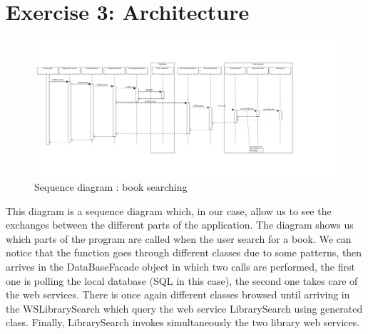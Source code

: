 \documentclass[a4paper,10pt]{article}
\begin{document}
\section{Exercise 3: Architecture}
\clearpage
\begin{landscape}
\begin{figure}[h]
   \includegraphics[scale=0.4]{uml/sequence.png}
   \caption{\label{sequence} Sequence diagram : book searching}
\end{figure}
\end{landscape}
This diagram is a sequence diagram which, in our case, allow us to see the exchanges between the different parts of the application. The diagram shows us which parts of the program are called when the user search for a book. We can notice that the function goes through different classes due to some patterns, then arrives in the DataBaseFacade object in which two calls are performed, the first one is polling the local database (SQL in this case), the second one takes care of the web services. There is once again different classes browsed until arriving in the WSLibrarySearch which query the web service LibrarySearch using generated class. Finally, LibrarySearch invokes simultaneously the two library web services.
\end{document}
